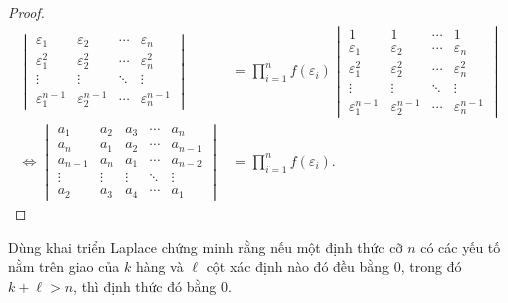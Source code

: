 \documentclass[class=nhvh-linear-algebra,crop=false]{standalone}
\begin{document}
\begin{proof}
\begin{align*}
\begin{vmatrix}
            \varepsilon_{1}       & \varepsilon_{2}       & \cdots & \varepsilon_{n}       \\
            \varepsilon_{1}^{2}   & \varepsilon_{2}^{2}   & \cdots & \varepsilon_{n}^{2}   \\
            \vdots                & \vdots                & \ddots & \vdots                \\
            \varepsilon_{1}^{n-1} & \varepsilon_{2}^{n-1} & \cdots & \varepsilon_{n}^{n-1}
        \end{vmatrix}
         & =
        \prod^{n}_{i=1}f(\varepsilon_{i})
        \begin{vmatrix}
            1                     & 1                     & \cdots & 1                     \\
            \varepsilon_{1}       & \varepsilon_{2}       & \cdots & \varepsilon_{n}       \\
            \varepsilon_{1}^{2}   & \varepsilon_{2}^{2}   & \cdots & \varepsilon_{n}^{2}   \\
            \vdots                & \vdots                & \ddots & \vdots                \\
            \varepsilon_{1}^{n-1} & \varepsilon_{2}^{n-1} & \cdots & \varepsilon_{n}^{n-1}
        \end{vmatrix} \\
        \Leftrightarrow
        \begin{vmatrix}
            a_{1}   & a_{2}  & a_{3}  & \cdots & a_{n}   \\
            a_{n}   & a_{1}  & a_{2}  & \cdots & a_{n-1} \\
            a_{n-1} & a_{n}  & a_{1}  & \cdots & a_{n-2} \\
            \vdots  & \vdots & \vdots & \ddots & \vdots  \\
            a_{2}   & a_{3}  & a_{4}  & \cdots & a_{1}
        \end{vmatrix}
         & =
        \prod^{n}_{i=1}f(\varepsilon_{i}).
    \end{align*}
\end{proof}

\begin{exercise}
    \par Dùng khai triển Laplace chứng minh rằng nếu một định thức cỡ $n$ có các yếu tố nằm trên giao của $k$ hàng và $\ell$ cột xác định nào đó đều bằng 0, trong đó $k + \ell > n$, thì định thức đó bằng 0.
\end{exercise}
\end{document}
